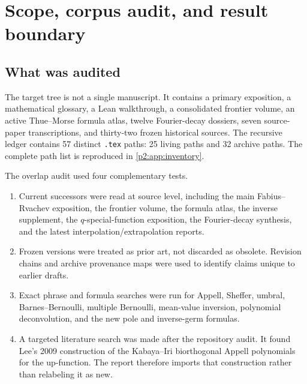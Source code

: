 \documentclass[11pt,oneside]{article}
\numberwithin{equation}{section}
\theoremstyle{definition}
\theoremstyle{remark}
\begin{document}
\begingroup
\footnotesize
\setlength{\parskip}{0pt}

\endgroup
\clearpage

\section{Scope, corpus audit, and result boundary}
\label{p2:sec:scope}

\subsection{What was audited}

The target tree is not a single manuscript.  It contains a primary exposition, a mathematical
glossary, a Lean walkthrough, a consolidated frontier volume, an active Thue--Morse formula atlas,
twelve Fourier-decay dossiers, seven source-paper transcriptions, and thirty-two frozen historical
sources.  The recursive ledger contains 57 distinct \texttt{.tex} paths: 25 living paths and 32 archive
paths.  The complete path list is reproduced in \cref{p2:app:inventory}.

The overlap audit used four complementary tests.
\begin{enumerate}
\item Current successors were read at source level, including the main Fabius--Rvachev exposition,
      the frontier volume, the formula atlas, the inverse supplement, the $q$-special-function
      exposition, the Fourier-decay synthesis, and the latest interpolation/extrapolation reports.
\item Frozen versions were treated as prior art, not discarded as obsolete.  Revision chains and
      archive provenance maps were used to identify claims unique to earlier drafts.
\item Exact phrase and formula searches were run for Appell, Sheffer, umbral, Barnes--Bernoulli,
      multiple Bernoulli, mean-value inversion, polynomial deconvolution, and the new pole and
      inverse-germ formulas.
\item A targeted literature search was made after the repository audit.  It found Lee's 2009
      construction of the Kabaya--Iri biorthogonal Appell polynomials for the up-function.  The
      report therefore imports that construction rather than relabeling it as new.
\end{enumerate}
\end{document}
